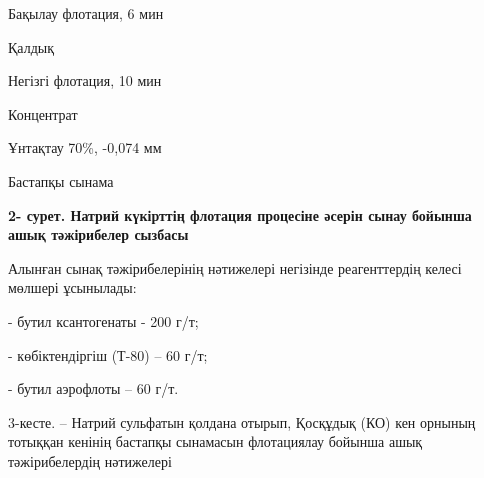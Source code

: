 {Бақылау флотация, 6 мин

Қалдық

Негізгі флотация, 10 мин

Концентрат

Ұнтақтау 70\%, -0,074 мм

Бастапқы сынама

{\bfseries 2- сурет. Натрий күкірттің флотация процесіне әсерін сынау
бойынша ашық тәжірибелер сызбасы}

Алынған сынақ тәжірибелерінің нәтижелері негізінде реагенттердің келесі
мөлшері ұсынылады:

- бутил ксантогенаты - 200 г/т;

- көбіктендіргіш (Т-80) -- 60 г/т;

- бутил аэрофлоты -- 60 г/т.

3-кесте. -- Натрий сульфатын қолдана отырып, Қосқұдық (КО) кен орнының
тотыққан кенінің бастапқы сынамасын флотациялау бойынша ашық
тәжірибелердің нәтижелері

}
